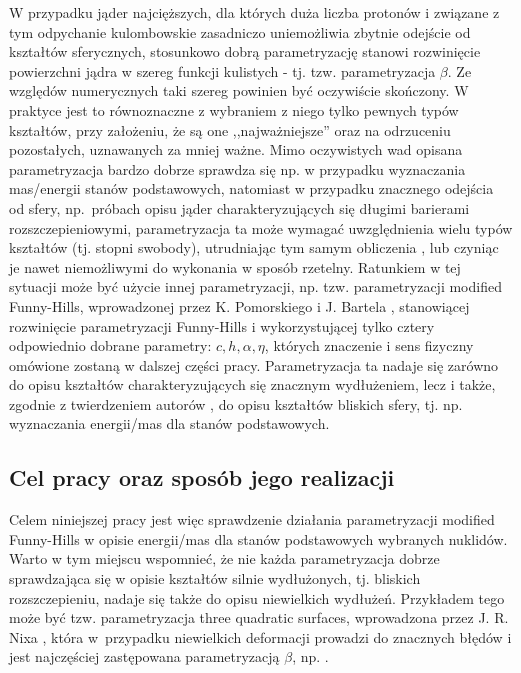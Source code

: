 \documentclass[a4paper,polish]{article}
\numberwithin{equation}{section}
\begin{document}
W przypadku jąder najcięższych, dla których duża liczba protonów i związane z tym odpychanie kulombowskie zasadniczo uniemożliwia zbytnie odejście od kształtów sferycznych, stosunkowo dobrą parametryzację stanowi rozwinięcie powierzchni jądra w szereg funkcji kulistych - tj. tzw. parametryzacja $\beta$. Ze względów numerycznych taki szereg powinien być oczywiście skończony. W praktyce jest to równoznaczne z wybraniem z niego tylko pewnych typów kształtów, przy założeniu, że są one ,,najważniejsze'' oraz na odrzuceniu pozostałych, uznawanych za mniej ważne. Mimo oczywistych wad opisana parametryzacja bardzo dobrze sprawdza się np. w przypadku wyznaczania mas/energii stanów podstawowych, natomiast w przypadku znacznego odejścia od sfery, np.~próbach opisu jąder charakteryzujących się długimi barierami rozszczepieniowymi, parametryzacja ta może wymagać uwzględnienia wielu typów kształtów (tj. stopni swobody), utrudniając tym samym obliczenia \cite{Jach1}, lub czyniąc je nawet niemożliwymi do wykonania w sposób rzetelny. Ratunkiem w tej sytuacji może być użycie innej parametryzacji, np. tzw. parametryzacji modified Funny-Hills, wprowadzonej przez K. Pomorskiego i J. Bartela \cite{MFH}, stanowiącej rozwinięcie parametryzacji Funny-Hills \cite{OLDMFH} i wykorzystującej tylko cztery odpowiednio dobrane parametry: $c, h, \alpha, \eta$, których znaczenie i sens fizyczny omówione zostaną w dalszej części pracy. Parametryzacja ta nadaje się zarówno do opisu kształtów charakteryzujących się znacznym wydłużeniem, lecz i także, zgodnie z twierdzeniem autorów \cite{MFH}, do opisu kształtów bliskich sfery, tj. np. wyznaczania energii/mas dla stanów podstawowych.

\clearpage
\subsection{Cel pracy oraz sposób jego realizacji}

Celem niniejszej pracy jest więc sprawdzenie działania parametryzacji modified Funny-Hills w opisie energii/mas dla stanów podstawowych wybranych nuklidów. Warto w tym miejscu wspomnieć, że nie każda parametryzacja dobrze sprawdzająca się w opisie kształtów silnie wydłużonych, tj. bliskich rozszczepieniu, nadaje się także do opisu niewielkich wydłużeń. Przykładem tego może być tzw. parametryzacja three quadratic surfaces, wprowadzona przez J. R. Nixa \cite{NIX}, która w~przypadku niewielkich deformacji prowadzi do znacznych błędów i jest najczęściej zastępowana parametryzacją $\beta$, np. \cite{Moll2009}.
\end{document}
